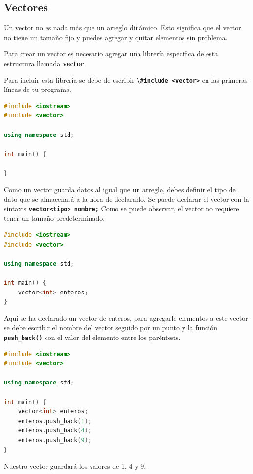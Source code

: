 \documentclass{article}
\begin{document}
\subsection{Vectores}

Un vector no es nada más que un arreglo dinámico. Esto significa que el vector no tiene un tamaño fijo y puedes agregar y quitar elementos sin problema.

Para crear un vector es necesario agregar una librería específica de esta estructura llamada \textbf{vector}

Para incluir esta librería se debe de escribir \textbf{\lstinline{\#include <vector>}} en las primeras líneas de tu programa.

\begin{lstlisting}[language=C++, title=Vectores]
#include <iostream>
#include <vector>

using namespace std;

int main() {

}
\end{lstlisting}

Como un vector guarda datos al igual que un arreglo, debes definir el tipo de dato que se almacenará a la hora de declararlo. Se puede declarar el vector con la sintaxis \textbf{\lstinline{vector<tipo> nombre;}} Como se puede observar, el vector no requiere tener un tamaño predeterminado.

\begin{lstlisting}[language=C++, title=Vectores]
#include <iostream>
#include <vector>

using namespace std;

int main() {
	vector<int> enteros;
}
\end{lstlisting}

Aquí se ha declarado un vector de enteros, para agregarle elementos a este vector se debe escribir el nombre del vector seguido por un punto y la función \textbf{\lstinline{push_back()}} con el valor del elemento entre los paréntesis.

\begin{lstlisting}[language=C++, title=Agregando valores]
#include <iostream>
#include <vector>

using namespace std;

int main() {
	vector<int> enteros;
	enteros.push_back(1);
	enteros.push_back(4);
	enteros.push_back(9);
}
\end{lstlisting}

Nuestro vector guardará los valores de 1, 4 y 9.
\end{document}
